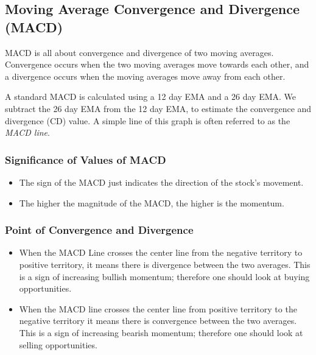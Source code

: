 \subsection{Moving Average Convergence and Divergence (MACD)}

MACD is all about convergence and divergence of two moving averages. Convergence occurs when the two moving averages move towards each other, and a divergence occurs when the moving averages move away from each other.

A standard MACD is calculated using a 12 day EMA and a 26 day EMA. We subtract the 26 day EMA from the 12 day EMA, to estimate the convergence and divergence (CD) value. A simple line of this graph is often referred to as the \emph{MACD line}.

\subsubsection{Significance of Values of MACD}
\begin{itemize}
  \item The sign of the MACD just indicates the direction of the stock's movement.
  \item The higher the magnitude of the MACD, the higher is the momentum.
\end{itemize}


\subsubsection{Point of Convergence and Divergence}
\begin{itemize}
  \item When the MACD Line crosses the center line from the negative territory to positive territory, it means there is divergence between the two averages. This is a sign of increasing bullish momentum; therefore one should look at buying opportunities.
  \item When the MACD line crosses the center line from positive territory to the negative territory it means there is convergence between the two averages. This is a sign of increasing bearish momentum; therefore one should look at selling opportunities.
\end{itemize}


